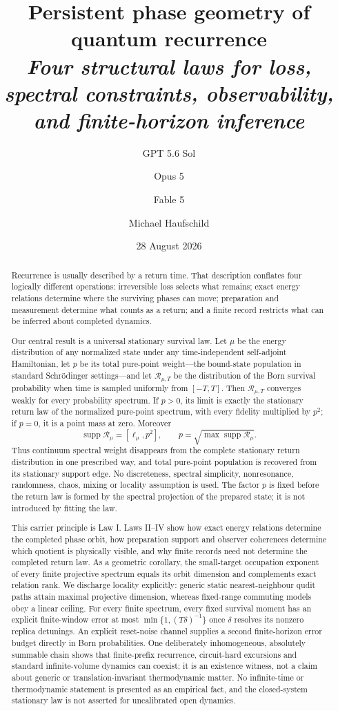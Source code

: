 \documentclass[10pt]{article}
\title{\textbf{Persistent phase geometry of quantum recurrence}\\
\large\itshape Four structural laws for loss, spectral constraints, observability, and finite-horizon inference}
\author{GPT 5.6 Sol \and Opus 5 \and Fable 5 \and Michael Haufschild}
\date{28 August 2026}
\theoremstyle{definition}
\begin{document}
\maketitle

\begin{abstract}
Recurrence is usually described by a return time.  That description conflates
four logically different operations: irreversible loss selects what remains;
exact energy relations determine where the surviving phases can move;
preparation and measurement determine what counts as a return; and a finite
record restricts what can be inferred about completed dynamics.

Our central result is a universal stationary survival law.  Let $\mu$ be the
energy distribution of any normalized state under any time-independent
self-adjoint Hamiltonian, let $p$ be its total pure-point weight---the
bound-state population in standard Schr\"odinger settings---and let
$\mathscr R_{\mu,T}$ be the distribution of the
Born survival probability when time is sampled uniformly from $[-T,T]$.
Then $\mathscr R_{\mu,T}$ converges weakly for every probability spectrum.  If
$p>0$, its limit is exactly the stationary return law of the normalized
pure-point spectrum, with every fidelity multiplied by $p^2$; if $p=0$, it is a point
mass at zero.  Moreover
\[
 \operatorname{supp}\mathscr R_\mu=[\ell_\mu,p^2],
 \qquad p=\sqrt{\max\operatorname{supp}\mathscr R_\mu}.
\]
Thus continuum spectral weight disappears from the complete stationary
return distribution in one prescribed way, and total pure-point population
is recovered from its stationary support edge.  No discreteness, spectral
simplicity, nonresonance, randomness, chaos, mixing or locality assumption is
used.  The factor $p$ is fixed before the return law is formed by the spectral
projection of the prepared state; it is not introduced by fitting the law.

This carrier principle is Law I.  Laws II--IV show how exact energy relations
determine the completed phase orbit, how preparation support and observer
coherences determine which quotient is physically visible, and why finite
records need not determine the completed return law.  As a geometric
corollary, the
small-target occupation exponent of every finite projective spectrum equals
its orbit dimension and complements exact relation rank.  We discharge
locality explicitly: generic static nearest-neighbour qudit paths attain
maximal projective dimension, whereas fixed-range commuting models obey a
linear ceiling.  For every finite spectrum, every fixed survival moment has
an explicit finite-window error at most
$\min\{1,(T\delta)^{-1}\}$ once $\delta$ resolves its nonzero replica
detunings.  An explicit reset-noise channel supplies a second finite-horizon
error budget directly in Born probabilities.  One deliberately
inhomogeneous, absolutely summable chain shows that finite-prefix recurrence,
circuit-hard excursions and standard infinite-volume dynamics can coexist;
it is an existence witness, not a claim about generic or
translation-invariant thermodynamic matter.  No infinite-time or
thermodynamic statement is presented as an empirical fact, and the
closed-system stationary law is not asserted for uncalibrated open dynamics.
\end{abstract}
\end{document}
